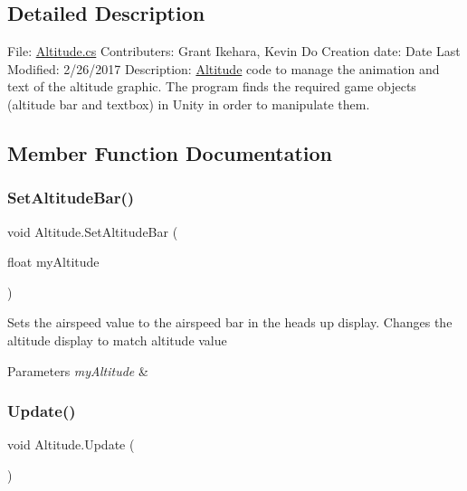 \subsection{Detailed Description}
File\+: \hyperlink{_altitude_8cs}{Altitude.\+cs} Contributers\+: Grant Ikehara, Kevin Do Creation date\+: Date Last Modified\+: 2/26/2017 Description\+: \hyperlink{class_altitude}{Altitude} code to manage the animation and text of the altitude graphic. The program finds the required game objects (altitude bar and textbox) in Unity in order to manipulate them. 



\subsection{Member Function Documentation}
\mbox{\label{class_altitude_a3d4e8f7adf282747e565285b467826d8}} 
\subsubsection{\texorpdfstring{Set\+Altitude\+Bar()}{SetAltitudeBar()}}
{\footnotesize\ttfamily void Altitude.\+Set\+Altitude\+Bar (\begin{DoxyParamCaption}\item[{float}]{my\+Altitude }\end{DoxyParamCaption})}



Sets the airspeed value to the airspeed bar in the heads up display. Changes the altitude display to match altitude value 


\begin{DoxyParams}{Parameters}
{\em my\+Altitude} & \\
\hline
\end{DoxyParams}
\mbox{\label{class_altitude_ae8b828d3dd00635459030c41e28ca771}} 
\subsubsection{\texorpdfstring{Update()}{Update()}}
{\footnotesize\ttfamily void Altitude.\+Update (\begin{DoxyParamCaption}{ }\end{DoxyParamCaption})}



